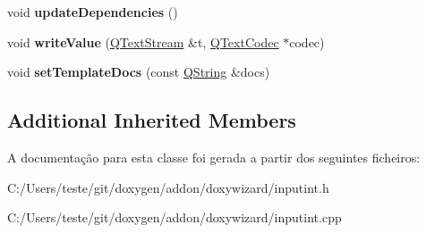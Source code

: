 \begin{DoxyCompactItemize}
\item 
\hypertarget{class_input_int_a37cd3bc28aa6e7a7845bbaca9b007da2}{void {\bfseries update\-Dependencies} ()}\label{class_input_int_a37cd3bc28aa6e7a7845bbaca9b007da2}

\item 
\hypertarget{class_input_int_a9a9359fba2cb1dfbac6a19e36adbadf9}{void {\bfseries write\-Value} (\hyperlink{class_q_text_stream}{Q\-Text\-Stream} \&t, \hyperlink{class_q_text_codec}{Q\-Text\-Codec} $\ast$codec)}\label{class_input_int_a9a9359fba2cb1dfbac6a19e36adbadf9}

\item 
\hypertarget{class_input_int_a3736660c3a13fe78902eb7a843e7eb3f}{void {\bfseries set\-Template\-Docs} (const \hyperlink{class_q_string}{Q\-String} \&docs)}\label{class_input_int_a3736660c3a13fe78902eb7a843e7eb3f}

\end{DoxyCompactItemize}
\subsection*{Additional Inherited Members}


A documentação para esta classe foi gerada a partir dos seguintes ficheiros\-:\begin{DoxyCompactItemize}
\item 
C\-:/\-Users/teste/git/doxygen/addon/doxywizard/inputint.\-h\item 
C\-:/\-Users/teste/git/doxygen/addon/doxywizard/inputint.\-cpp\end{DoxyCompactItemize}
